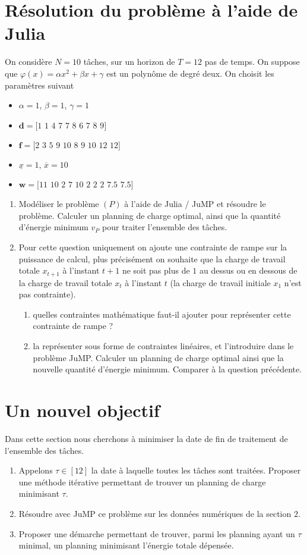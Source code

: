 \documentclass[10pt]{article}
\begin{document}
\section{Résolution du problème à l'aide de Julia}
On considère $N=10$ tâches, sur un horizon de $T=12$ pas de temps. On suppose que $\varphi(x) = \alpha x^2+ \beta x + \gamma $ est un polynôme de degré deux. On choisit les paramètres suivant
\begin{itemize}
	\item $\alpha = 1$, $\beta=1$, $\gamma = 1$
	\item $\mathbf{d}=\textrm{[1 1 4 7 7 8 6 7 8 9]}$
	\item $\mathbf{f}=\textrm{[2 3 5 9 10 8 9 10 12 12]}$
	\item $\underline{x}=1$, $\overline{x} = 10$
	\item $\mathbf{w}=\textrm{[11 10 2 7 10 2 2 2 7.5 7.5]}$
\end{itemize}
\begin{enumerate}[resume]
	\item Modéliser le problème $(P)$ à l'aide de Julia / JuMP et résoudre le problème.
	Calculer un planning de charge optimal, ainsi que la quantité d'énergie minimum $v_P$ pour traiter l'ensemble des tâches.
	\item Pour cette question uniquement on ajoute une contrainte de rampe sur la puissance de calcul, plus précisément on souhaite que la charge de travail totale $x_{t+1}$ à l'instant $t+1$ ne soit pas plus de $1$ au dessus ou en dessous de la charge de travail totale $x_t$ à l'instant $t$ (la charge de travail initiale $x_1$ n'est pas contrainte).
	\begin{enumerate}
		\item quelles contraintes mathématique faut-il ajouter pour représenter cette contrainte de rampe ?
		\item la représenter sous forme de contraintes linéaires, et l'introduire dans le problème JuMP. Calculer un planning de charge optimal ainsi que la nouvelle quantité d'énergie minimum. Comparer à la question précédente.
	\end{enumerate}
\end{enumerate}


\section{Un nouvel objectif}
Dans cette section nous cherchons à minimiser la date de fin de traitement de l'ensemble des tâches.
\begin{enumerate}[resume]
	\item Appelons $\tau \in [12]$ la date à laquelle toutes les tâches sont traitées. Proposer une méthode itérative permettant de trouver un planning de charge minimisant $\tau$.
	\item Résoudre avec JuMP ce problème sur les données numériques de la section $2$.
	\item Proposer une démarche permettant de trouver, parmi les planning ayant un $\tau$ minimal, un planning minimisant l'énergie totale dépensée.
\end{enumerate}
\end{document}
